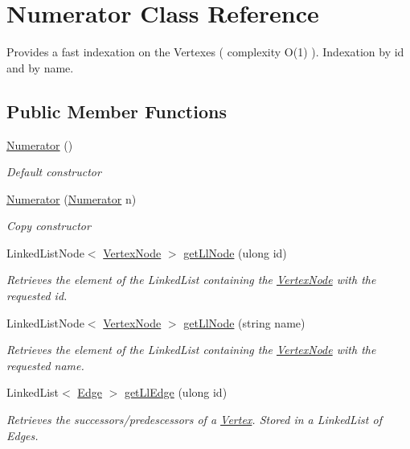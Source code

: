 \hypertarget{classNumerator}{}\section{Numerator Class Reference}
\label{classNumerator}


Provides a fast indexation on the Vertexes ( complexity O(1) ). Indexation by id and by name.  


\subsection*{Public Member Functions}
\begin{DoxyCompactItemize}
\item 
\hyperlink{classNumerator_a2c146868937564adc3e68759ebf66e25}{Numerator} ()
\begin{DoxyCompactList}\small\item\em Default constructor \end{DoxyCompactList}\item 
\hyperlink{classNumerator_a76d3d2a8cea83a945b332b11945bcaf3}{Numerator} (\hyperlink{classNumerator}{Numerator} n)
\begin{DoxyCompactList}\small\item\em Copy constructor \end{DoxyCompactList}\item 
Linked\+List\+Node$<$ \hyperlink{classVertexNode}{Vertex\+Node} $>$ \hyperlink{classNumerator_ae18456abf7a029e36e9227060e63504c}{get\+Ll\+Node} (ulong id)
\begin{DoxyCompactList}\small\item\em Retrieves the element of the Linked\+List containing the \hyperlink{classVertexNode}{Vertex\+Node} with the requested id. \end{DoxyCompactList}\item 
Linked\+List\+Node$<$ \hyperlink{classVertexNode}{Vertex\+Node} $>$ \hyperlink{classNumerator_aff4348496d1326c9d6c4ee71be22c05b}{get\+Ll\+Node} (string name)
\begin{DoxyCompactList}\small\item\em Retrieves the element of the Linked\+List containing the \hyperlink{classVertexNode}{Vertex\+Node} with the requested name. \end{DoxyCompactList}\item 
Linked\+List$<$ \hyperlink{classEdge}{Edge} $>$ \hyperlink{classNumerator_ab43f0110fef2122e8ccd536b2650b895}{get\+Ll\+Edge} (ulong id)
\begin{DoxyCompactList}\small\item\em Retrieves the successors/predescessors of a \hyperlink{structVertex}{Vertex}. Stored in a Linked\+List of Edges. \end{DoxyCompactList}\item 

\end{DoxyCompactItemize}
